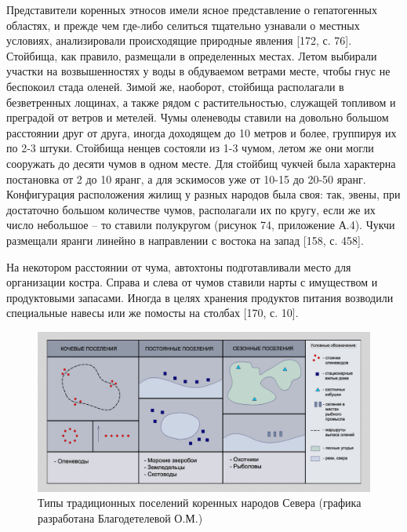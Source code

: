 Представители коренных этносов имели ясное представление о гепатогенных областях, и прежде чем где-либо селиться тщательно узнавали о местных условиях,
анализировали происходящие природные явления [172, с. 76]. Стойбища, как правило, размещали в определенных местах.
Летом выбирали участки на возвышенностях у воды в обдуваемом ветрами месте, чтобы гнус не беспокоил стада оленей.
Зимой же, наоборот, стойбища располагали в безветренных лощинах, а также рядом с растительностью, служащей топливом и преградой от ветров и метелей.
Чумы оленеводы ставили на довольно большом расстоянии друг от друга, иногда доходящем до 10 метров и более, группируя их по 2-3 штуки.
Стойбища ненцев состояли из 1-3 чумом, летом же они могли сооружать до десяти чумов в одном месте. Для стойбищ чукчей была характерна постановка от 2 до 10 яранг, а для эскимосов уже от 10-15 до 20-50 яранг.
Конфигурация расположения жилищ у разных народов была своя: так, эвены, при достаточно большом количестве чумов, располагали их по кругу, если же их число небольшое – то ставили полукругом (рисунок 74, приложение А.4). Чукчи размещали яранги линейно в направлении с востока на запад [158, с. 458].

На некотором расстоянии от чума, автохтоны подготавливали место для организации костра. Справа и слева от чумов ставили нарты с имуществом и продуктовыми запасами.
Иногда в целях хранения продуктов питания возводили специальные навесы или же помосты на столбах [170, с. 10].

\begin{figure}
    \centering
    \includegraphics[width=\textwidth]{assets/figures/ch01_s10_urbanplan_settelsystems03}
    \caption{Типы традиционных поселений коренных народов Севера (графика разработана Благодетелевой О.М.)}
    \author{графика разработана Благодетелевой О.М.}
    \label{fig:ch01_s10_urbanplan_settelsystems03}
  \end{figure}